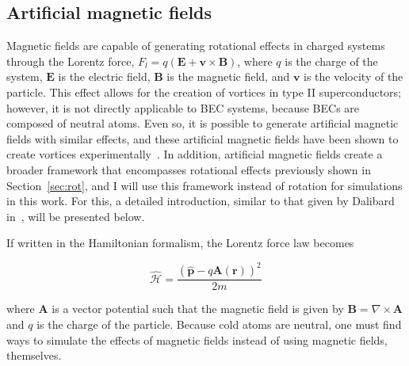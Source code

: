 \subsection{Artificial magnetic fields}
\label{sec:gauge}

Magnetic fields are capable of generating rotational effects in charged systems through the Lorentz force, $F_l = q(\mathbf{E} + \mathbf{v} \times \mathbf{B})$, where $q$ is the charge of the system, $\mathbf{E}$ is the electric field, $\mathbf{B}$ is the magnetic field, and $\mathbf{v}$ is the velocity of the particle.
This effect allows for the creation of vortices in type II superconductors; however, it is not directly applicable to BEC systems, because BECs are composed of neutral atoms.
Even so, it is possible to generate artificial magnetic fields with similar effects, and these artificial magnetic fields have  been shown to create vortices experimentally~\cite{lin2009}.
In addition, artificial magnetic fields create a broader framework that encompasses rotational effects previously shown in Section~\ref{sec:rot}, and I will use this framework instead of rotation for simulations in this work.
For this, a detailed introduction, similar to that given by Dalibard in~\cite{dalibard2015}, will be presented below.

If written in the Hamiltonian formalism, the Lorentz force law becomes

\begin{equation}
\mathcal{\hat{H}} = \frac{(\mathbf{\hat p} - q\mathbf{A}(\mathbf{r}))^2}{2m}
\end{equation}

\noindent where $\mathbf{A}$ is a vector potential such that the magnetic field is given by $\mathbf{B} = \nabla \times \mathbf{A}$ and $q$ is the charge of the particle.
Because cold atoms are neutral, one must find ways to simulate the effects of magnetic fields instead of using magnetic fields, themselves.

